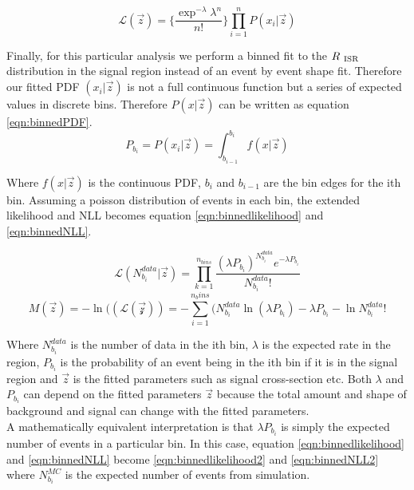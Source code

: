 \begin{equation}
\label{eqn:ExtLikelihood}
{\mathcal{L}}(\vec{z}) = \{ \frac{\exp^{-\lambda}{\lambda}^n}{n!} \}  {\displaystyle\prod_{i=1}^{n}} P(x_i|\vec{z})
\end{equation}

\indent Finally, for this particular analysis we perform a binned fit to the $R_{~\mathrm{ISR}}$ distribution in the signal region instead of an event by event shape fit.  Therefore our fitted PDF $(x_i|\vec{z})$ is not a full continuous function but a series of expected values in discrete bins.  Therefore $P(x|\vec{z})$ can be written as equation \ref{eqn:binnedPDF}. \\

\begin{equation}
\label{eqn:binnedPDF}
P_{b_i} = P(x_i|\vec{z}) = \int^{b_i}_{b_{i-1}} f(x|\vec{z})
\end{equation}

Where $f(x|\vec{z})$ is the continuous PDF, $b_i$ and $b_{i-1} $ are the bin edges for the ith bin. Assuming a poisson distribution of events in each bin, the extended likelihood and NLL becomes equation \ref{eqn:binnedlikelihood} and \ref{eqn:binnedNLL}.

\begin{equation}
\label{eqn:binnedlikelihood}
{\mathcal{L}}(N^{data}_{b_i}|\vec{z}) = {\displaystyle\prod_{k=1}^{n_{bins}} \frac{({\lambda}P_{b_i})^{N^{data}_{b_i}}e^{-{\lambda}P_{b_i}}}{N^{data}_{b_i}!}}
\end{equation}
\begin{equation}
\label{eqn:binnedNLL}
M(\vec{z})=-\ln(({\mathcal{L(\vec{z})}}) = -{\displaystyle\sum_{i=1}^{n_bins}} ( N^{data}_{b_i} \ln( {\lambda}P_{b_i} ) - {\lambda}P_{b_i} - \ln{N^{data}_{b_i}!}
\end{equation}

\indent Where $N^{data}_{b_i}$ is the number of data in the ith bin, $\lambda$ is the expected rate in the region, $P_{b_i}$ is the probability of an event being in the ith bin if it is in the signal region and $\vec{z}$ is the fitted parameters such as signal cross-section etc.   Both $\lambda$ and $P_{b_i}$ can depend on the fitted parameters $\vec{z}$ because the total amount and shape of background and signal can change with the fitted parameters. \\

\indent A mathematically equivalent interpretation is that ${\lambda}P_{b_i}$ is simply the expected number of events in a particular bin.  In this case, equation \ref{eqn:binnedlikelihood} and \ref{eqn:binnedNLL} become \ref{eqn:binnedlikelihood2} and \ref{eqn:binnedNLL2} where $N^{MC}_{b_i}$ is the expected number of events from simulation. \\

